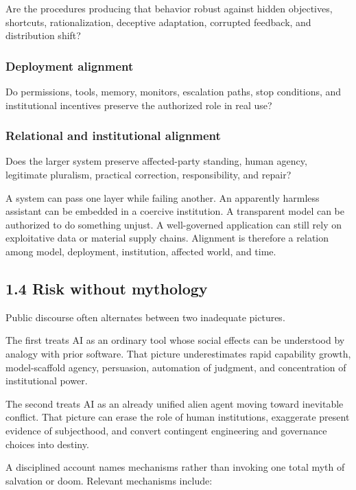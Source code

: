 \documentclass[
  11pt,
]{article}
\begin{document}
Are the procedures producing that behavior robust against hidden
objectives, shortcuts, rationalization, deceptive adaptation, corrupted
feedback, and distribution shift?

\subsubsection{Deployment alignment}\label{deployment-alignment}

Do permissions, tools, memory, monitors, escalation paths, stop
conditions, and institutional incentives preserve the authorized role in
real use?

\subsubsection{Relational and institutional
alignment}\label{relational-and-institutional-alignment}

Does the larger system preserve affected-party standing, human agency,
legitimate pluralism, practical correction, responsibility, and repair?

A system can pass one layer while failing another. An apparently
harmless assistant can be embedded in a coercive institution. A
transparent model can be authorized to do something unjust. A
well-governed application can still rely on exploitative data or
material supply chains. Alignment is therefore a relation among model,
deployment, institution, affected world, and time.

\subsection{1.4 Risk without mythology}\label{risk-without-mythology}

Public discourse often alternates between two inadequate pictures.

The first treats AI as an ordinary tool whose social effects can be
understood by analogy with prior software. That picture underestimates
rapid capability growth, model-scaffold agency, persuasion, automation
of judgment, and concentration of institutional power.

The second treats AI as an already unified alien agent moving toward
inevitable conflict. That picture can erase the role of human
institutions, exaggerate present evidence of subjecthood, and convert
contingent engineering and governance choices into destiny.

A disciplined account names mechanisms rather than invoking one total
myth of salvation or doom. Relevant mechanisms include:
\end{document}
